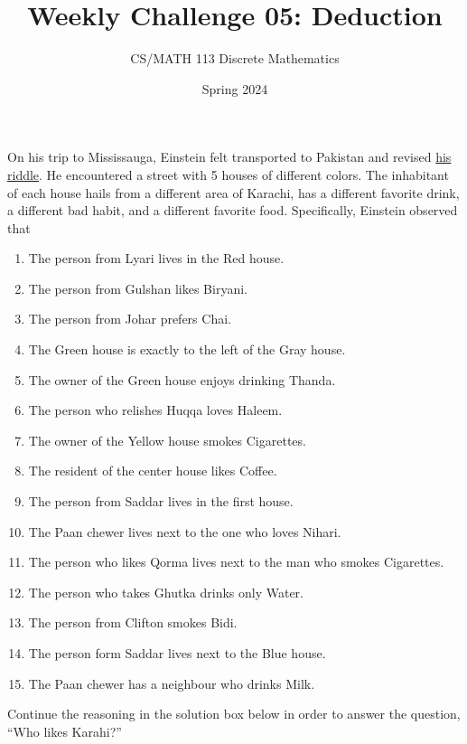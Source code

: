 \documentclass[a4paper]{exam}
\title{Weekly Challenge 05: Deduction}
\author{CS/MATH 113 Discrete Mathematics}
\date{Spring 2024}
\begin{document}
\maketitle

\begin{questions}


  On his trip to Mississauga, Einstein felt transported to Pakistan and revised \href{https://en.wikipedia.org/wiki/Zebra_Puzzle}{his riddle}. He encountered a street with 5 houses of different colors. The inhabitant of each house hails from a different area of Karachi, has a different favorite drink, a different bad habit, and a different favorite food.
  Specifically, Einstein observed that
  \begin{enumerate}
  \item\label{i1} The person from Lyari lives in the Red house.
  \item\label{i2} The person from Gulshan likes Biryani.
  \item\label{i3} The person from Johar prefers Chai.
  \item\label{i4} The Green house is exactly to the left of the Gray house.
  \item\label{i5} The owner of the Green house enjoys drinking Thanda.
  \item\label{i6} The person who relishes Huqqa loves Haleem.
  \item\label{i7} The owner of the Yellow house smokes Cigarettes.
  \item\label{i8} The resident of the center house likes Coffee.
  \item\label{i9} The person from Saddar lives in the first house.
  \item\label{i10} The Paan chewer lives next to the one who loves Nihari.
  \item\label{i11} The person who likes Qorma lives next to the man who smokes Cigarettes.
  \item\label{i12} The person who takes Ghutka drinks only Water.
  \item\label{i13} The person from Clifton smokes Bidi.
  \item\label{i14} The person form Saddar lives next to the Blue house.
  \item\label{i15} The Paan chewer has a neighbour who drinks Milk.
  \end{enumerate}
  
  Continue the reasoning in the solution box below in order to answer the question, ``Who likes Karahi?''
  

\end{questions}
\end{document}
